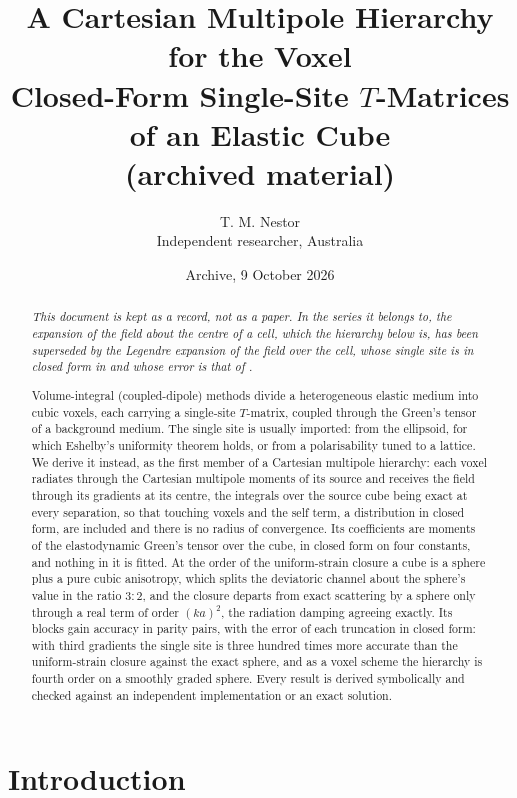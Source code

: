 \documentclass[11pt,a4paper]{article}
\title{\bfseries A Cartesian Multipole Hierarchy for the Voxel\\[4pt]
\large Closed-Form Single-Site $T$-Matrices of an Elastic Cube\\[2pt]
\normalsize (archived material)}
\author{T. M. Nestor\\[2pt]\small Independent researcher, Australia}
\date{Archive, 9 October 2026}
\begin{document}
\maketitle

\begin{abstract}
\noindent
\emph{This document is kept as a record, not as a paper. In the series it belongs to, the expansion of
the field about the centre of a cell, which the hierarchy below is, has been superseded by the Legendre
expansion of the field over the cell, whose single site is in closed form in \citet{NestorLegendre2026}
and whose error is that of \citet{NestorError2026}.}

Volume-integral (coupled-dipole) methods divide a heterogeneous elastic medium into cubic voxels, each
carrying a single-site $T$-matrix, coupled through the Green's tensor of a background medium. The single
site is usually imported: from the ellipsoid, for which Eshelby's uniformity theorem holds, or from a
polarisability tuned to a lattice. We derive it instead, as the first member of a Cartesian multipole
hierarchy: each voxel radiates through the Cartesian multipole moments of its source and receives the
field through its gradients at its centre, the integrals over the source cube being exact at every
separation, so that touching voxels and the self term, a distribution in closed form, are included and
there is no radius of convergence. Its coefficients are moments of the elastodynamic Green's tensor over
the cube, in closed form on four constants, and nothing in it is fitted. At the order of the
uniform-strain closure a cube is a sphere plus a pure cubic anisotropy, which splits the deviatoric
channel about the sphere's value in the ratio $3:2$, and the closure departs from exact scattering by a
sphere only through a real term of order $(ka)^2$, the radiation damping agreeing exactly. Its blocks gain
accuracy in parity pairs, with the error of each truncation in closed form: with third gradients the
single site is three hundred times more accurate than the uniform-strain closure against the exact sphere,
and as a voxel scheme the hierarchy is fourth order on a smoothly graded sphere. Every result is derived
symbolically and checked against an independent implementation or an exact solution.
\end{abstract}

\section{Introduction}\label{sec:intro}
\end{document}
